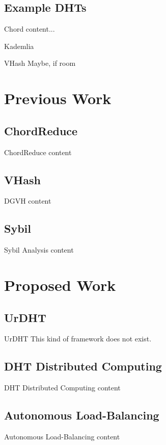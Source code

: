\documentclass[11pt,aspectratio=169]{beamer}
\begin{document}
\subsection{Example DHTs}

\begin{frame}{Chord}
	content...
\end{frame}

\begin{frame}{Kademlia}
\end{frame}

\begin{frame}{VHash}
	Maybe, if room
\end{frame}
\section{Previous Work}

\subsection{ChordReduce}

\begin{frame}{ChordReduce}
	content
\end{frame}

\subsection{VHash}


\begin{frame}{DGVH}
	content
\end{frame}


\subsection{Sybil}

\begin{frame}{Sybil Analysis}
	content
\end{frame}

\section{Proposed Work}



\subsection{UrDHT}
\begin{frame}{UrDHT}
	This kind of framework does not exist.
\end{frame}


\subsection{DHT Distributed Computing}
\begin{frame}{DHT Distributed Computing}
	content
\end{frame}



\subsection{Autonomous Load-Balancing}
\begin{frame}{Autonomous Load-Balancing}
	content
\end{frame}




\end{document}
